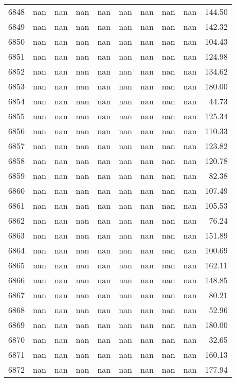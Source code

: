 \begin{tabular}{lrrrrrrrrr}
6848 & nan & nan & nan & nan & nan & nan & nan & nan & 144.50 \\
6849 & nan & nan & nan & nan & nan & nan & nan & nan & 142.32 \\
6850 & nan & nan & nan & nan & nan & nan & nan & nan & 104.43 \\
6851 & nan & nan & nan & nan & nan & nan & nan & nan & 124.98 \\
6852 & nan & nan & nan & nan & nan & nan & nan & nan & 134.62 \\
6853 & nan & nan & nan & nan & nan & nan & nan & nan & 180.00 \\
6854 & nan & nan & nan & nan & nan & nan & nan & nan & 44.73 \\
6855 & nan & nan & nan & nan & nan & nan & nan & nan & 125.34 \\
6856 & nan & nan & nan & nan & nan & nan & nan & nan & 110.33 \\
6857 & nan & nan & nan & nan & nan & nan & nan & nan & 123.82 \\
6858 & nan & nan & nan & nan & nan & nan & nan & nan & 120.78 \\
6859 & nan & nan & nan & nan & nan & nan & nan & nan & 82.38 \\
6860 & nan & nan & nan & nan & nan & nan & nan & nan & 107.49 \\
6861 & nan & nan & nan & nan & nan & nan & nan & nan & 105.53 \\
6862 & nan & nan & nan & nan & nan & nan & nan & nan & 76.24 \\
6863 & nan & nan & nan & nan & nan & nan & nan & nan & 151.89 \\
6864 & nan & nan & nan & nan & nan & nan & nan & nan & 100.69 \\
6865 & nan & nan & nan & nan & nan & nan & nan & nan & 162.11 \\
6866 & nan & nan & nan & nan & nan & nan & nan & nan & 148.85 \\
6867 & nan & nan & nan & nan & nan & nan & nan & nan & 80.21 \\
6868 & nan & nan & nan & nan & nan & nan & nan & nan & 52.96 \\
6869 & nan & nan & nan & nan & nan & nan & nan & nan & 180.00 \\
6870 & nan & nan & nan & nan & nan & nan & nan & nan & 32.65 \\
6871 & nan & nan & nan & nan & nan & nan & nan & nan & 160.13 \\
6872 & nan & nan & nan & nan & nan & nan & nan & nan & 177.94 \\

\end{tabular}
